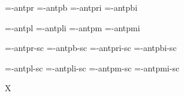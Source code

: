 
\ifx\sizespec\undefined \def\sizespec{}\fi
\ifx\font\corkencoded {}\else {}\fi


\ifx\dgsize\undefined {}\fi

\font\tenrm=\tmp-antpr\dgsize  \space\sizespec
\font\tenbf=\tmp-antpb\dgsize  \space\sizespec
\font\tenit=\tmp-antpri\dgsize \space\sizespec
\font\tenbi=\tmp-antpbi\dgsize \space\sizespec

\font\tenlr=\tmp-antpl\dgsize  \space\sizespec  \def\lr{\tenlr}
\font\tenli=\tmp-antpli\dgsize \space\sizespec  \def\li{\tenli}
\font\tenmr=\tmp-antpm\dgsize  \space\sizespec  \def\mr{\tenmr}
\font\tenmi=\tmp-antpmi\dgsize \space\sizespec  \def\mi{\tenmi}

\font\tenrmc=\tmp-antpr\dgsize-sc  \sizespec
\font\tenbfc=\tmp-antpb\dgsize-sc  \sizespec
\font\tenitc=\tmp-antpri\dgsize-sc \sizespec
\font\tenbic=\tmp-antpbi\dgsize-sc \sizespec

\font\tenlrc=\tmp-antpl\dgsize-sc  \sizespec 
\font\tenlic=\tmp-antpli\dgsize-sc \sizespec
\font\tenmrc=\tmp-antpm\dgsize-sc  \sizespec
\font\tenmic=\tmp-antpmi\dgsize-sc \sizespec

\let\dgsize=\undefined

\tenrm


\def\caps#1{{\escapechar=-1 \expandafter}%
  \expandafter\csname\expandafter\tenonlytext\string#1c\endcsname}
\def\tenonlytext{ten}

\ifx\regfontdefault\undefined \else
  \regfontdefault
  \regfont\tenlr  \regfont\tenli
  \regfont\tenmr  \regfont\tenmi
  \regfont\tenrmc \regfont\tenitc
  \regfont\tenbfc \regfont\tenbic
  \regfont\tenlrc \regfont\tenlic
  \regfont\tenmrc \regfont\tenmic
\fi

\ifx\mathpreloaded X\else  \fi                     

\ifx\font\corkencoded \else  \fi

